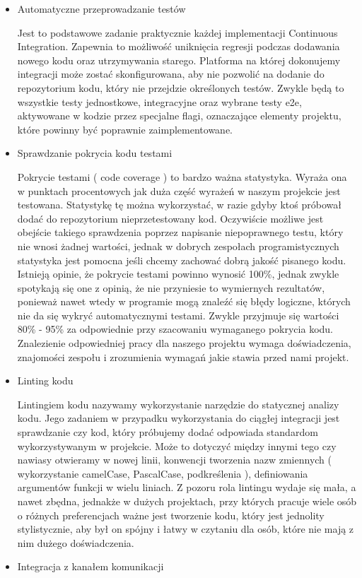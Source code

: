 \begin{itemize}
    \item Automatyczne przeprowadzanie testów 
    
    Jest to podstawowe zadanie praktycznie każdej implementacji Continuous Integration. Zapewnia to możliwość uniknięcia regresji podczas dodawania nowego kodu oraz utrzymywania starego. 
    Platforma na której dokonujemy integracji może zostać skonfigurowana, aby nie pozwolić na dodanie do repozytorium kodu, który nie przejdzie określonych testów. Zwykle będą to wszystkie testy jednostkowe, integracyjne oraz wybrane testy e2e, aktywowane w kodzie przez specjalne flagi, oznaczające elementy projektu, które powinny być poprawnie zaimplementowane. 
    \item Sprawdzanie pokrycia kodu testami
    
    Pokrycie testami ( code coverage ) to bardzo ważna statystyka. Wyraża ona w punktach procentowych jak duża część wyrażeń w naszym projekcie jest testowana. Statystykę tę można wykorzystać, w razie gdyby ktoś próbował dodać do repozytorium nieprzetestowany kod. Oczywiście możliwe jest obejście takiego sprawdzenia poprzez napisanie niepoprawnego testu, który nie wnosi żadnej wartości, jednak w dobrych zespołach programistycznych statystyka jest pomocna jeśli chcemy zachować dobrą jakość pisanego kodu. Istnieją opinie, że pokrycie testami powinno wynosić 100\%, jednak zwykle spotykają się one z opinią, że nie przyniesie to wymiernych rezultatów, ponieważ nawet wtedy w programie mogą znaleźć się błędy logiczne, których nie da się wykryć automatycznymi testami. Zwykle przyjmuje się wartości 80\% - 95\% za odpowiednie przy szacowaniu wymaganego pokrycia kodu. Znalezienie odpowiedniej pracy dla naszego projektu wymaga doświadczenia, znajomości zespołu i zrozumienia wymagań jakie stawia przed nami projekt.
    \item Linting kodu
    
    Lintingiem kodu nazywamy wykorzystanie narzędzie do statycznej analizy kodu. Jego zadaniem w przypadku wykorzystania do ciągłej integracji jest sprawdzanie czy kod, który próbujemy dodać odpowiada standardom wykorzystywanym w projekcie. Może to dotyczyć między innymi tego czy nawiasy otwieramy w nowej linii, konwencji tworzenia nazw zmiennych ( wykorzystanie camelCase, PascalCase, podkreślenia ), definiowania argumentów funkcji w wielu liniach. Z pozoru rola lintingu wydaje się mała, a nawet zbędna, jednakże w dużych projektach, przy których pracuje wiele osób o różnych preferencjach ważne jest tworzenie kodu, który jest jednolity stylistycznie, aby był on spójny i łatwy w czytaniu dla osób, które nie mają z nim dużego doświadczenia.
    \item Integracja z kanałem komunikacji
    

\end{itemize}
